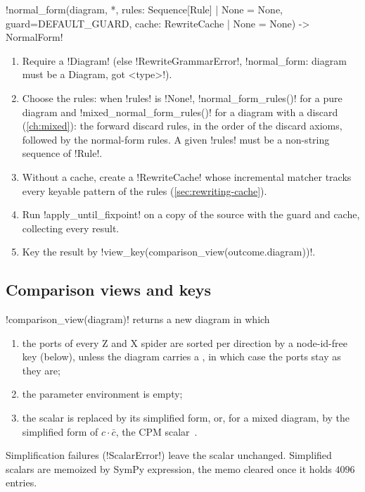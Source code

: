 \begin{signature}
\py!normal_form(diagram, *, rules: Sequence[Rule] | None = None, guard=DEFAULT_GUARD, cache: RewriteCache | None = None) -> NormalForm!
\end{signature}
\begin{algorithm}\label{alg:rewriting-nf}
\leavevmode
\begin{enumerate}
\item Require a \py!Diagram! (else \py!RewriteGrammarError!, \code!normal_form: diagram must be a Diagram, got <type>!).
\item Choose the rules: when \py!rules! is \py!None!, \py!normal_form_rules()! for a pure diagram and
  \py!mixed_normal_form_rules()! for a diagram with a discard (\cref{ch:mixed}): the forward discard
  rules, in the order of the discard axioms, followed by the normal-form rules. A given \py!rules!
  must be a non-string sequence of \py!Rule!.
\item Without a cache, create a \py!RewriteCache! whose incremental matcher tracks every keyable
  pattern of the rules (\cref{sec:rewriting-cache}).
\item Run \py!apply_until_fixpoint! on a copy of the source with the guard and cache, collecting
  every result.
\item Key the result by \py!view_key(comparison_view(outcome.diagram))!.
\end{enumerate}
\end{algorithm}

\subsection{Comparison views and keys}

\begin{definition}\label{def:rewriting-view}
\py!comparison_view(diagram)! returns a new diagram in which
\begin{enumerate}
\item the ports of every Z and X spider are sorted per direction by a node-id-free key (below),
  unless the diagram carries a \bbox{}, in which case the ports stay as they are;
\item the parameter environment is empty;
\item the scalar is replaced by its simplified form, or, for a mixed diagram, by the simplified form
  of $c\cdot\bar c$, the CPM scalar~\cite{selinger2007cpm}.
\end{enumerate}
Simplification failures (\py!ScalarError!) leave the scalar unchanged. Simplified scalars are
memoized by SymPy expression, the memo cleared once it holds $4096$ entries.
\end{definition}

